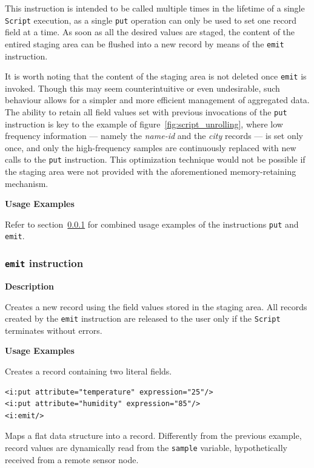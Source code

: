 This instruction is intended to be called multiple times in the lifetime of a
single \texttt{Script} execution, as a single \texttt{put} operation can only
be used to set one record field at a time. As soon as all the desired values
are staged, the content of the entired staging area can be flushed into a new
record by means of the \texttt{emit} instruction.

It is worth noting that the content of the staging area is not deleted once
\texttt{emit} is invoked. Though this may seem counterintuitive or even
undesirable, such behaviour allows for a simpler and more efficient management
of aggregated data. The ability to retain all field values set with previous
invocations of the \texttt{put} instruction is key to the example of
figure~\ref{fig:script_unrolling}, where low frequency information --- namely
the \textit{name-id} and the \textit{city} records --- is set only once, and
only the high-frequency samples are continuously replaced with new calls to the
\texttt{put} instruction. This optimization technique would not be possible if
the staging area were not provided with the aforementioned memory-retaining
mechanism.

\textbf{Usage Examples}

Refer to section~\ref{sec:emit_instruction} for combined usage examples of the
instructions \texttt{put} and \texttt{emit}.


\subsubsection{\texttt{emit} instruction}
\label{sec:emit_instruction}

\textbf{Description}

Creates a new record using the field values stored in the staging area. All
records created by the \texttt{emit} instruction are released to the user only
if the \texttt{Script} terminates without errors.

\textbf{Usage Examples}

Creates a record containing two literal fields.

\lstset{language=XML}
\begin{lstlisting}
<i:put attribute="temperature" expression="25"/>
<i:put attribute="humidity" expression="85"/>
<i:emit/>
\end{lstlisting}

Maps a flat data structure into a record. Differently from the previous
example, record values are dynamically read from the \texttt{sample} variable,
hypothetically received from a remote sensor node.


